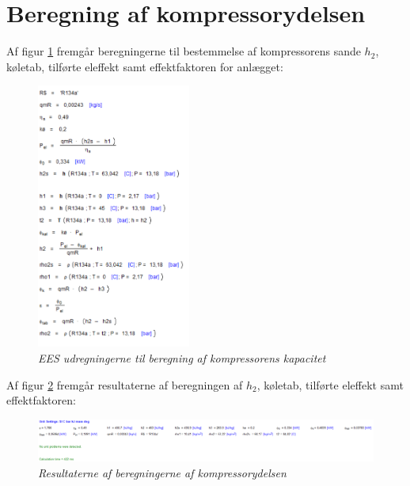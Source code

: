 \documentclass[Hovedrapport.tex]{subfiles}
\begin{document}
\section{Beregning af kompressorydelsen}
    \label{sec:apndx_kompressorberegninger}
Af figur \ref{fig:apndx_kompressorberegninger1} fremgår beregningerne til bestemmelse af kompressorens sande $h_2$, køletab, tilførte eleffekt samt effektfaktoren for anlægget:
\begin{figure}[H]
    \centering
    \includegraphics[width=0.45\textwidth]{Billeder/kompressor_bereg1.PNG}
    \caption{\textit{EES udregningerne til beregning af kompressorens kapacitet}}
    \label{fig:apndx_kompressorberegninger1}
\end{figure}

Af figur \ref{fig:apndx_kompressorberegninger2} fremgår resultaterne af beregningen af $h_2$, køletab, tilførte eleffekt samt effektfaktoren:
\begin{figure}[H]
    \centering
    \includegraphics[width=1.0\textwidth]{Billeder/kompressor_bereg2.PNG}
    \caption{\textit{Resultaterne af beregningerne af kompressorydelsen}}
    \label{fig:apndx_kompressorberegninger2}
\end{figure}
\newpage

\end{document}
